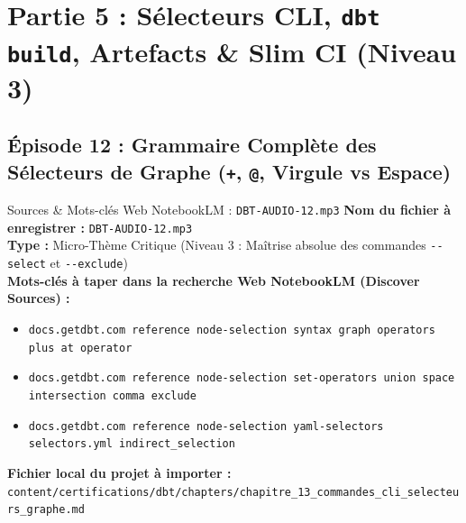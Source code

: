 \documentclass[11pt,a4paper]{article}
\newcommand{\flag}[1]{\texttt{-{}-#1}}
\begin{document}
\newpage

\section{Partie 5 : Sélecteurs CLI, \texttt{dbt build}, Artefacts \& Slim CI (Niveau 3)}

\subsection{Épisode 12 : Grammaire Complète des Sélecteurs de Graphe (\texttt{+}, \texttt{@}, Virgule vs Espace)}
\begin{sourcebox}{Sources \& Mots-clés Web NotebookLM : \texttt{DBT-AUDIO-12.mp3}}
\textbf{Nom du fichier à enregistrer :} \texttt{DBT-AUDIO-12.mp3}\\
\textbf{Type :} Micro-Thème Critique (Niveau 3 : Maîtrise absolue des commandes \flag{select} et \flag{exclude})\\
\textbf{Mots-clés à taper dans la recherche Web NotebookLM (Discover Sources) :}
\begin{itemize}[noitemsep]
    \item \texttt{docs.getdbt.com reference node-selection syntax graph operators plus at operator}
    \item \texttt{docs.getdbt.com reference node-selection set-operators union space intersection comma exclude}
    \item \texttt{docs.getdbt.com reference node-selection yaml-selectors selectors.yml indirect_selection}
\end{itemize}
\textbf{Fichier local du projet à importer :}
\texttt{content/certifications/dbt/chapters/chapitre_13_commandes_cli_selecteurs_graphe.md}
\end{sourcebox}
\end{document}
